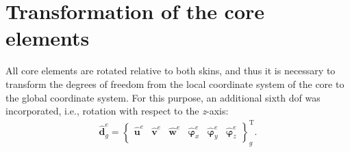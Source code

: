 \section{Transformation of the core elements}
\label{sec:transformation}

All core elements are rotated relative to both skins, and thus it is necessary to transform the degrees of freedom from the local coordinate system of the core to the global coordinate system.
For this purpose, an additional sixth \ac{dof} was incorporated, i.e., rotation with respect to the \textit{z}-axis:
\begin{eqnarray}
	\widehat{\textbf{d}}^e_g = \left \{\begin{array}{cccccc}
		\widehat{\textbf{u}}^e & \widehat{\textbf{v}}^e &
		\widehat{\textbf{w}}^e & \widehat{\boldsymbol{\varphi}}_x^e &
		\widehat{\boldsymbol{\varphi}}_y^e & \widehat{\boldsymbol{\varphi}}_z^e
	\end{array}\right \}^{\mathrm{T}}_g.
	\label{eq:d6}
\end{eqnarray}

